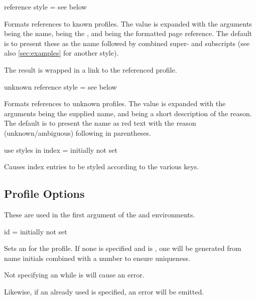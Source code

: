 \documentclass[
	a4paper,
]{article}
\begin{document}
\begin{docKey}
	{reference style}
	{=}
	{see below}

	Formats references to known profiles. The value is expanded with the arguments  being the name,  being the , and  being the formatted page reference. The default is to present these as the name followed by combined super- and subscripts (see also \cref{sec:examples} for another style).

	The result is wrapped in a  link to the referenced profile.
\end{docKey}

\begin{docKey}
	{unknown reference style}
	{=}
	{see below}

	Formats references to unknown profiles. The value is expanded with the arguments  being the supplied name, and  being a short description of the reason. The default is to present the name as red text with the reason (unknown/ambiguous) following in parentheses.
\end{docKey}

\begin{docKey}
	{use styles in index}
	{=}
	{initially not set}

	Causes index entries to be styled according to the various  keys.
\end{docKey}


\subsection{Profile Options} %

\label{sec:profopts}
These are used in the first argument of the  and  environments.

\begin{docKey}
	{id}
	{=}
	{initially not set}

	Sets an  for the profile. If none is specified and  is , one will be generated from name initials combined with a number to ensure uniqueness.

	Not specifying an  while  is  will cause an error.

	Likewise, if an already used  is specified, an error will be emitted.
\end{docKey}
\end{document}
